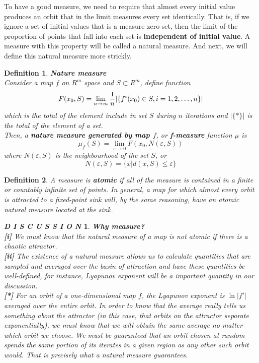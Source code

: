 \documentclass[12pt]{article}
\theoremstyle{plain}
\newtheorem{definition}{{\color{red}\textbf{Definition}}}[section]
\newtheorem{discussion}{\textit{D I S C U S S I O N}}[section]
\begin{document}
To have a good measure, we need to require that almost every initial value produces an orbit that in the limit measures every set identically. That is, if we ignore a set of initial values that is a measure zero set, then the limit of the proportion of points that fall into each set is \textbf{independent of initial value}. A measure with this property will be called a natural measure. And next, we will define this natural measure more strickly.

\begin{definition}\textbf{Nature measure}
\\\noindent Consider a map $f$ on $R^m$ space and $S \subset R^m$, define function 
$$
F(x_0, S) = \lim_{n \rightarrow \infty}{1\over n}|\{f^i(x_0) \in S, i = 1, 2, \ldots, n\}|
$$
            which is the total of the element include in set $S$ during $n$ iterations and $|\{*\}|$ is the total of the element of a set.
\\\noindent Then, a \textbf{nature measure generated by map $f$}, or \textbf{f-measure} function $\mu$ is 
$$
\mu_f(S) = \lim_{\varepsilon\rightarrow 0}F(x_0, N(\varepsilon, S))
$$
where $N(\varepsilon, S)$ is the neighbourhood of the set $S$, or
$$
N(\varepsilon, S) = \{x | d(x, S) \leq \varepsilon\}
$$
\end{definition}



\begin{definition}
A measure is \textbf{atomic} if all of the measure is contained in a finite or countably infinite set of points. In general, a map for which almost every orbit is attracted to a fixed-point sink will, by the same reasoning, have an atomic natural measure located at the sink.
\end{definition}



\begin{discussion}\textbf{Why measure?}
\\\noindent \textbf{[i]} We must know that the natural measure of a map is not atomic if there is a chaotic attractor.
\\\noindent \textbf{[ii]} The existence of a natural measure allows us to calculate quantities that are sampled and averaged over the basin of attraction and have these quantities be well-defined, for instance, Lyapunov exponent will be a important quantity in our discussion.
\\          \textbf{[*]} For an orbit of a one-dimensional map $f$, the Lyapunov exponent is $\ln|f'|$ averaged over the entire orbit. In order to know that the average really tells us something about the attractor (in this case, that orbits on the attractor separate exponentially), we must know that we will obtain the same average no matter which orbit we choose. We must be guaranteed that an orbit chosen at random spends the same portion of its iterates in a given region as any other such orbit would. That is precisely what a natural measure guarantees.
\end{discussion}
\end{document}
